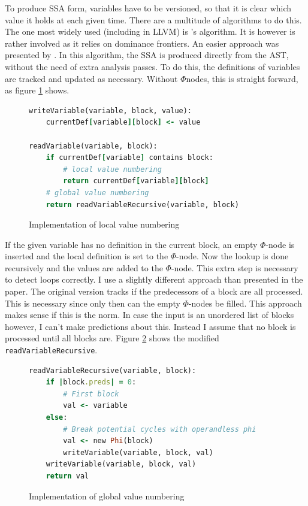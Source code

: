 \documentclass[a4paper,bibliography=totocnumbered,parskip,headsepline]{scrbook}
\begin{document}
To produce SSA form, variables have to be versioned, so that it is clear which value it holds at each given time.
There are a multitude of algorithms to do this.
The one most widely used (including in LLVM) is \citeauthor{cytron91efficiently}'s algorithm.
It is however is rather involved as it relies on dominance frontiers.
An easier approach was presented by \citeauthor{braun13simple}.
In this algorithm, the SSA is produced directly from the AST, without the need of extra analysis passes.
To do this, the definitions of variables are tracked and updated as necessary.
Without $\Phi$nodes, this is straight forward, as figure \ref{fig:localnum} shows.

\begin{figure}
\begin{lstlisting}[language=ruby]
writeVariable(variable, block, value):
    currentDef[variable][block] <- value

readVariable(variable, block):
    if currentDef[variable] contains block:
        # local value numbering
        return currentDef[variable][block]
    # global value numbering
    return readVariableRecursive(variable, block)
\end{lstlisting}
\caption{Implementation of local value numbering}
\label{fig:localnum}
\end{figure}

If the given variable has no definition in the current block, an empty $\Phi$-node is inserted and the local definition is set to the $\Phi$-node.
Now the lookup is done recursively and the values are added to the $\Phi$-node.
This extra step is necessary to detect loops correctly.
I use a slightly different approach than presented in the paper.
The original version tracks if the predecessors of a block are all processed.
This is necessary since only then can the empty $\Phi$-nodes be filled.
This approach makes sense if this is the norm.
In case the input is an unordered list of blocks however, I can't make predictions about this.
Instead I assume that no block is processed until all blocks are.
Figure \ref{fig:globalnum} shows the modified \lstinline[language=haskell]!readVariableRecursive!.

\begin{figure}[t]
\begin{lstlisting}[language=ruby]
readVariableRecursive(variable, block):
    if |block.preds| = 0:
        # First block
        val <- variable
    else:
        # Break potential cycles with operandless phi
        val <- new Phi(block)
        writeVariable(variable, block, val)
    writeVariable(variable, block, val)
    return val
\end{lstlisting}
\caption{Implementation of global value numbering}
\label{fig:globalnum}
\end{figure}
\end{document}
